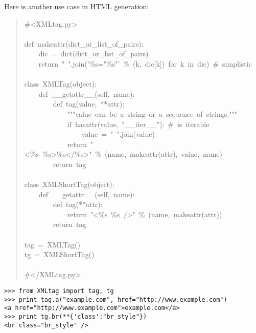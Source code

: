 \documentclass[10pt,a4paper,english]{article}
\begin{document}
Here is another use case in HTML generation:
\begin{quote}{\ttfamily \raggedright \noindent
{\#}<XMLtag.py>~\\
~\\
def~makeattr(dict{\_}or{\_}list{\_}of{\_}pairs):~\\
~~~~dic~=~dict(dict{\_}or{\_}list{\_}of{\_}pairs)~~\\
~~~~return~"~".join('{\%}s="{\%}s"'~{\%}~(k,~dic{[}k])~for~k~in~dic)~{\#}~simplistic~\\
~\\
class~XMLTag(object):~\\
~~~~def~{\_}{\_}getattr{\_}{\_}(self,~name):~\\
~~~~~~~~def~tag(value,~**attr):~\\
~~~~~~~~~~~~"{}"{}"value~can~be~a~string~or~a~sequence~of~strings."{}"{}"~\\
~~~~~~~~~~~~if~hasattr(value,~"{\_}{\_}iter{\_}{\_}"):~{\#}~is~iterable~\\
~~~~~~~~~~~~~~~~value~=~"~".join(value)~\\
~~~~~~~~~~~~return~"<{\%}s~{\%}s>{\%}s</{\%}s>"~{\%}~(name,~makeattr(attr),~value,~name)~\\
~~~~~~~~return~tag~\\
~\\
class~XMLShortTag(object):~\\
~~~~def~{\_}{\_}getattr{\_}{\_}(self,~name):~\\
~~~~~~~~def~tag(**attr):~\\
~~~~~~~~~~~~return~"<{\%}s~{\%}s~/>"~{\%}~(name,~makeattr(attr))~\\
~~~~~~~~return~tag~\\
~\\
tag~=~XMLTag()~\\
tg~=~XMLShortTag()~\\
~\\
{\#}</XMLtag.py>
}\end{quote}
\begin{verbatim}>>> from XMLtag import tag, tg
>>> print tag.a("example.com", href="http://www.example.com")
<a href="http://www.example.com">example.com</a>
>>> print tg.br(**{'class':"br_style"})
<br class="br_style" />\end{verbatim}



\hypertarget{keyword-dictionaries-with-getattr-setattr}{}
\end{document}
